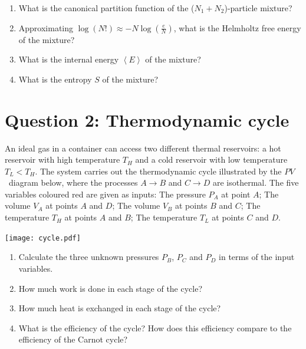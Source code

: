 \documentclass[12 pt]{article} %
\newcommand{\vev}[1]{\ensuremath{\left\langle #1 \right\rangle} }
\newcommand{\showmarks}[1]{\rightline{\texttt{[#1 marks]}}} %
\begin{document}
\begin{enumerate}[label={(\alph*)}]
  \item What is the canonical partition function of the ($N_1 + N_2$)-particle mixture?

  \showmarks{4}

  \item Approximating $\displaystyle \log\left(N!\right) \approx -N \log\left(\frac{e}{N}\right)$, what is the Helmholtz free energy of the mixture?

  \showmarks{4}

  \item What is the internal energy $\vev{E}$ of the mixture?

  \showmarks{4}

  \item What is the entropy $S$ of the mixture?

  \showmarks{4}
\end{enumerate}



\section*{Question 2: Thermodynamic cycle}
An ideal gas in a container can access two different thermal reservoirs: a hot reservoir with high temperature $T_H$ and a cold reservoir with low temperature $T_L < T_H$.
The system carries out the thermodynamic cycle illustrated by the $PV$~diagram below, where the processes $A \to B$ and $C \to D$ are isothermal.
The five variables coloured red are given as inputs: The pressure $P_A$ at point $A$; The volume $V_A$ at points $A$ and $D$; The volume $V_B$ at points $B$ and $C$; The temperature $T_H$ at points $A$ and $B$; The temperature $T_L$ at points $C$ and $D$.

\begin{center}\texttt{[image: cycle.pdf]}\end{center}

\begin{enumerate}[label={(\alph*)}]
  \item Calculate the three unknown pressures $P_B$, $P_C$ and $P_D$ in terms of the input variables.

  \showmarks{6}

  \item How much work is done in each stage of the cycle?

  \showmarks{8}

  \item How much heat is exchanged in each stage of the cycle?

  \showmarks{8}

  \item What is the efficiency of the cycle?
        How does this efficiency compare to the efficiency of the Carnot cycle?

  \showmarks{6}
\end{enumerate}
\end{document}
